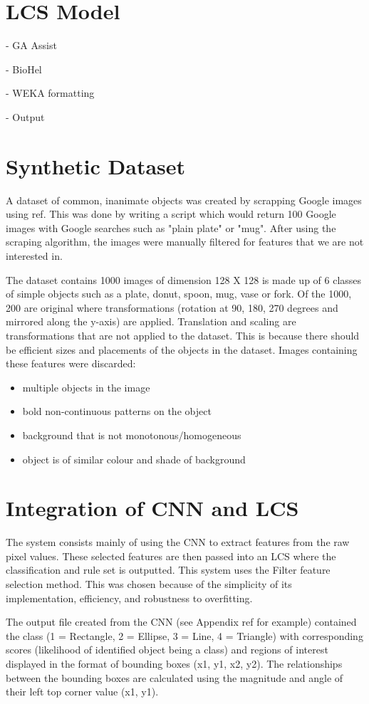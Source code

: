 \section{LCS Model}
- GA Assist

- BioHel

- WEKA formatting 

- Output
\section{Synthetic Dataset}
A dataset of common, inanimate objects was created by scrapping Google images using ref. This was done by writing a script which would return 100 Google images with Google searches such as "plain plate" or "mug". After using the scraping algorithm, the images were manually filtered for features that we are not interested in. 

The dataset contains 1000 images of dimension  128 X 128 is made up of 6 classes of simple objects such as a plate, donut, spoon, mug, vase or fork. Of the 1000, 200 are original where transformations (rotation at 90, 180, 270 degrees and mirrored along the y-axis) are applied. Translation and scaling are transformations that are not applied to the dataset. This is because there should be efficient sizes and placements of the objects in the dataset. Images containing these features were discarded:

\begin{itemize}
	\item multiple objects in the image
	\item bold non-continuous patterns on the object
	\item background that is not monotonous/homogeneous
	\item object is of similar colour and shade of background
\end{itemize}

\section{Integration of CNN and LCS}
The system consists mainly of using the CNN to extract features from the raw pixel values. These selected features are then passed into an LCS where the classification and rule set is outputted. This system uses the Filter feature selection method. This was chosen because of the simplicity of its implementation, efficiency, and robustness to overfitting. 

The output file created from the CNN (see Appendix ref for example) contained the class (1 = Rectangle, 2 = Ellipse, 3 = Line, 4 = Triangle) with corresponding scores (likelihood of identified object being a class) and regions of interest displayed in the format of bounding boxes (x1, y1, x2, y2). The relationships between the bounding boxes are calculated using the magnitude and angle of their left top corner value (x1, y1). 

